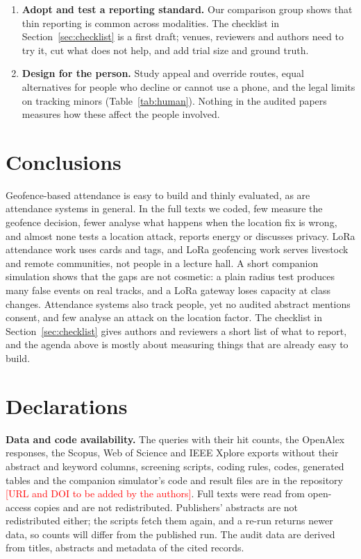 \documentclass[preprint,12pt]{elsarticle}
\newcommand{\todo}[1]{\textcolor{red}{[#1]}}
\begin{document}
\begin{enumerate}
\item \textbf{Adopt and test a reporting standard.} Our comparison group shows that thin reporting is common across modalities. The checklist in Section~\ref{sec:checklist} is a first draft; venues, reviewers and authors need to try it, cut what does not help, and add trial size and ground truth.
\item \textbf{Design for the person.} Study appeal and override routes, equal alternatives for people who decline or cannot use a phone, and the legal limits on tracking minors (Table~\ref{tab:human}). Nothing in the audited papers measures how these affect the people involved.
\end{enumerate}

\section{Conclusions}
Geofence-based attendance is easy to build and thinly evaluated, as are attendance systems in general. In the full texts we coded, few measure the geofence decision, fewer analyse what happens when the location fix is wrong, and almost none tests a location attack, reports energy or discusses privacy. LoRa attendance work uses cards and tags, and LoRa geofencing work serves livestock and remote communities, not people in a lecture hall. A short companion simulation shows that the gaps are not cosmetic: a plain radius test produces many false events on real tracks, and a LoRa gateway loses capacity at class changes. Attendance systems also track people, yet no audited abstract mentions consent, and few analyse an attack on the location factor. The checklist in Section~\ref{sec:checklist} gives authors and reviewers a short list of what to report, and the agenda above is mostly about measuring things that are already easy to build.

\section*{Declarations}
\noindent\textbf{Data and code availability.} The queries with their hit counts, the OpenAlex responses, the Scopus, Web of Science and IEEE Xplore exports without their abstract and keyword columns, screening scripts, coding rules, codes, generated tables and the companion simulator's code and result files are in the repository \todo{URL and DOI to be added by the authors}. Full texts were read from open-access copies and are not redistributed. Publishers' abstracts are not redistributed either; the scripts fetch them again, and a re-run returns newer data, so counts will differ from the published run. The audit data are derived from titles, abstracts and metadata of the cited records.
\end{document}
